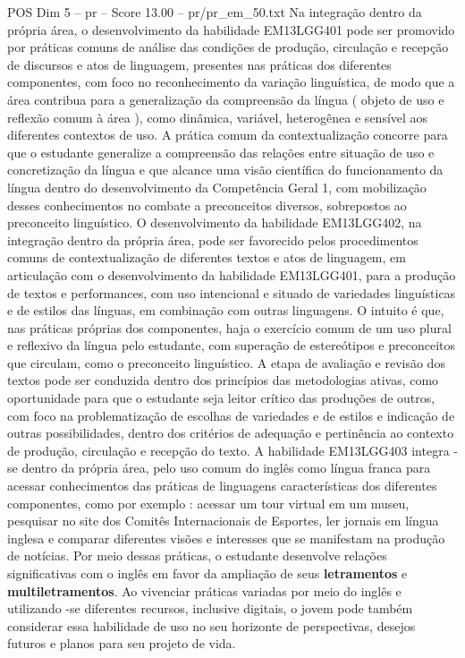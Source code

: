 \begin{textsample}{POS Dim 5 – pr – Score 13.00 – pr/pr\_em\_50.txt}
Na integração dentro da própria área, o desenvolvimento da habilidade EM13LGG401 pode ser promovido por práticas comuns de análise das condições de produção, circulação e recepção de discursos e atos de linguagem, presentes nas práticas dos diferentes componentes, com foco no reconhecimento da variação linguística, de modo que a área contribua para a generalização da compreensão da língua ( objeto de uso e reflexão comum à área ), como dinâmica, variável, heterogênea e sensível aos diferentes contextos de uso.
A prática comum da contextualização concorre para que o estudante generalize a compreensão das relações entre situação de uso e concretização da língua e que alcance uma visão científica do funcionamento da língua dentro do desenvolvimento da Competência Geral 1, com mobilização desses conhecimentos no combate a preconceitos diversos, sobrepostos ao preconceito linguístico.
O desenvolvimento da habilidade EM13LGG402, na integração dentro da própria área, pode ser favorecido pelos procedimentos comuns de contextualização de diferentes textos e atos de linguagem, em articulação com o desenvolvimento da habilidade EM13LGG401, para a produção de textos e performances, com uso intencional e situado de variedades linguísticas e de estilos das línguas, em combinação com outras linguagens.
O intuito é que, nas práticas próprias dos componentes, haja o exercício comum de um uso plural e reflexivo da língua pelo estudante, com superação de estereótipos e preconceitos que circulam, como o preconceito linguístico.
A etapa de avaliação e revisão dos textos pode ser conduzida dentro dos princípios das metodologias ativas, como oportunidade para que o estudante seja leitor crítico das produções de outros, com foco na problematização de escolhas de variedades e de estilos e indicação de outras possibilidades, dentro dos critérios de adequação e pertinência ao contexto de produção, circulação e recepção do texto.
A habilidade EM13LGG403 integra -se dentro da própria área, pelo uso comum do inglês como língua franca para acessar conhecimentos das práticas de linguagens características dos diferentes componentes, como por exemplo : acessar um tour virtual em um museu, pesquisar no site dos Comitês Internacionais de Esportes, ler jornais em língua inglesa e comparar diferentes visões e interesses que se manifestam na produção de notícias.
Por meio dessas práticas, o estudante desenvolve relações significativas com o inglês em favor da ampliação de seus \textbf{letramentos} e \textbf{multiletramentos}.
Ao vivenciar práticas variadas por meio do inglês e utilizando -se diferentes recursos, inclusive digitais, o jovem pode também considerar essa habilidade de uso no seu horizonte de perspectivas, desejos futuros e planos para seu projeto de vida.

\end{textsample}
